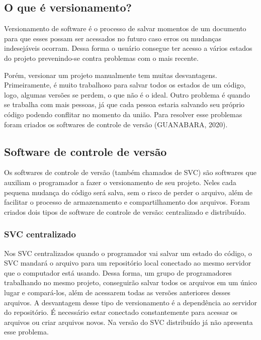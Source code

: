 \documentclass{article}
\begin{document}
\subsection{O que é versionamento?}
\hspace{4mm} Versionamento de software é o processo de salvar momentos de um documento para que esses possam ser acessados no futuro caso erros ou mudanças indesejáveis ocorram. Dessa forma o usuário consegue ter acesso a vários estados do projeto prevenindo-se contra problemas com o mais recente. 

Porém, versionar um projeto manualmente tem muitas desvantagens. \\Primeiramente, é muito trabalhoso para salvar todos os estados de um código, logo, algumas versões se perdem, o que não é o ideal. Outro problema é quando se trabalha com mais pessoas, já que cada pessoa estaria salvando seu próprio código podendo conflitar no momento da união. Para resolver esse problemas foram criados os softwares de controle de versão (GUANABARA, 2020).

\subsection{Software de controle de versão}
\hspace{4mm}Os softwares de controle de versão (também chamados de SVC) são softwares que auxiliam o programador a fazer o versionamento de seu projeto. Neles cada pequena mudança do código será salva, sem o risco de perder o arquivo, além de facilitar o processo de armazenamento e compartilhamento dos arquivos. Foram criados dois tipos de software de controle de versão: centralizado e distribuído.

\subsubsection{SVC centralizado}
\hspace{4mm}Nos SVC centralizados quando o programador vai salvar um estado do código, o SVC mandará o arquivo para um repositório local conectado ao mesmo servidor que o computador está usando. Dessa forma, um grupo de programadores trabalhando no mesmo projeto, conseguirão salvar todos os arquivos em um único lugar e compará-los, além de acessarem todas as versões anteriores desses arquivos. A desvantagem desse tipo de versionamento é a dependência ao servidor do repositório. É necessário estar conectado constantemente para acessar os arquivos ou criar arquivos novos. Na versão do SVC distribuído já não apresenta esse problema.
\end{document}
